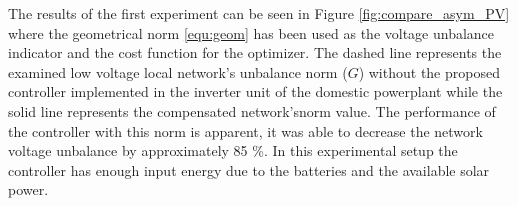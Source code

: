 %

                The results of the first experiment can be seen in Figure \ref{fig:compare_asym_PV} where the geometrical norm \ref{equ:geom} has been used as the voltage unbalance indicator and the cost function for the optimizer.  The dashed line represents the examined low voltage local network's unbalance norm ($G$) without the proposed controller implemented in the inverter unit of the domestic powerplant while the solid line represents the compensated network'snorm value. The performance of the controller with this norm is apparent, it was able to decrease the network voltage unbalance by approximately 85 \%. In this experimental setup the controller has enough input energy due to the batteries and the available solar power.

